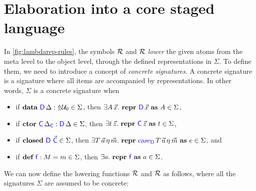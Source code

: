 \section{Elaboration into a core staged language}\label{sec:elaboration}

In \cref{fig:lambdarep-rules}, the symbols $\mathcal{R} {}$ and $\mathcal{R} {}$
\emph{lower} the given atoms from the meta level to the object level, through
the defined representations in $\Sigma$. To define them, we need to introduce a
concept of \emph{concrete signatures}. A concrete signature is a signature
where all items are accompanied by representations. In other words, $\Sigma$ is
a concrete signature when
\begin{itemize}
  \item if $\textbf{data} \ {\color{blue}{\mathsf{D}}} \, {\Delta} : \text{$\Uparrow$}{\mathcal{U}_0} \in \Sigma$, then $\exists A \, \vec{x} .\
          \textbf{repr} \ {\color{blue}{\mathsf{D}}}\, {\vec{x}}\ \textbf{as}\ {A} \in \Sigma$,
  \item if $\textbf{ctor} \ {\color{blue}{\mathsf{C}}} \, {\Delta_{{\color{blue}{\mathsf{C}}}}} : {\color{blue}{\mathsf{D}}}\, {\Delta} \in \Sigma$, then $\exists
          t\,\vec{z} .\ \textbf{repr} \ {{\color{blue}{\mathsf{C}}}}\, {\vec{z}}\ \textbf{as}\ {t} \in \Sigma$,
  \item if $\textbf{closed}\ {\color{blue}{\mathsf{D}}} \ \vec{{\color{blue}{\mathsf{C}}}} \in \Sigma$, then $\exists
          T\,\vec{a}\,\eta\,\vec{m} .\ \Srepr{\caselab{D}}{T\,\vec{a}\,\eta\,\vec{m} }{e}
          \in \Sigma$, and
  \item if $\textbf{def} \ {\color{blue}{\mathsf{f}}} : {M} = {m} \in \Sigma$, then $\exists a .\ \textbf{repr} \ {\color{blue}{\mathsf{f}}}\ \textbf{as}\ {a} \in
          \Sigma$.
\end{itemize}
We can now define the lowering functions $\mathcal{R} {}$ and $\mathcal{R} {}$ as follows, where
all the signatures $\Sigma$ are assumed to be concrete:

